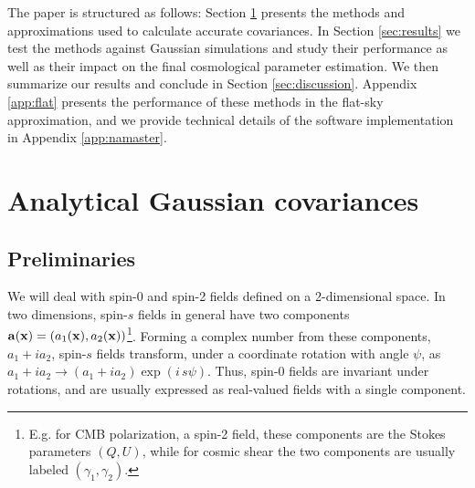 \documentclass[a4paper,11pt]{article}
\begin{document}
    The paper is structured as follows: Section \ref{sec:theory} presents the methods and approximations used to calculate accurate covariances. In Section \ref{sec:results} we test the methods against Gaussian simulations and study their performance as well as their impact on the final cosmological parameter estimation. We then summarize our results and conclude in Section \ref{sec:discussion}. Appendix \ref{app:flat} presents the performance of these methods in the flat-sky approximation, and we provide technical details of the software implementation in Appendix \ref{app:namaster}.

  \section{Analytical Gaussian covariances}\label{sec:theory}
    \subsection{Preliminaries}\label{ssec:theory.prelim}
      We will deal with spin-0 and spin-2 fields defined on a 2-dimensional space. In two dimensions, spin-$s$ fields in general have two components ${\bf a}({\bf x})=(a_1({\bf x}),a_2({\bf x}))$\footnote{E.g. for CMB polarization, a spin-2 field, these components are the Stokes parameters $(Q,U)$, while for cosmic shear the two components are usually labeled $(\gamma_1,\gamma_2)$.}. Forming a complex number from these components, $a_1+ia_2$, spin-$s$ fields transform, under a coordinate rotation with angle $\psi$, as $a_1+ia_2\rightarrow (a_1+ia_2)\exp(i\,s\psi)$. Thus, spin-0 fields are invariant under rotations, and are usually expressed as real-valued fields with a single component.
      
\end{document}

